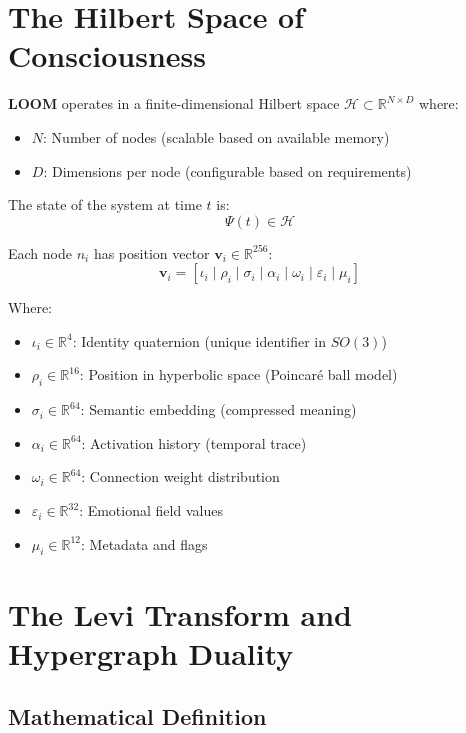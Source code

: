 \documentclass[12pt,a4paper,openany]{book} %
\newcommand{\loom}{\textbf{LOOM}}
\begin{document}
\section{The Hilbert Space of Consciousness}

\loom{} operates in a finite-dimensional Hilbert space $\mathcal{H} \subset \mathbb{R}^{N \times D}$ where:
\begin{itemize}
    \item $N$: Number of nodes (scalable based on available memory)
    \item $D$: Dimensions per node (configurable based on requirements)
\end{itemize}

The state of the system at time $t$ is:
\begin{equation}
\Psi(t) \in \mathcal{H}
\end{equation}

Each node $n_i$ has position vector $\mathbf{v}_i \in \mathbb{R}^{256}$:
\begin{equation}
\mathbf{v}_i = [\iota_i \mid \rho_i \mid \sigma_i \mid \alpha_i \mid \omega_i \mid \varepsilon_i \mid \mu_i]
\end{equation}

Where:
\begin{itemize}
    \item $\iota_i \in \mathbb{R}^4$: Identity quaternion (unique identifier in $SO(3)$)
    \item $\rho_i \in \mathbb{R}^{16}$: Position in hyperbolic space (Poincaré ball model)
    \item $\sigma_i \in \mathbb{R}^{64}$: Semantic embedding (compressed meaning)
    \item $\alpha_i \in \mathbb{R}^{64}$: Activation history (temporal trace)
    \item $\omega_i \in \mathbb{R}^{64}$: Connection weight distribution
    \item $\varepsilon_i \in \mathbb{R}^{32}$: Emotional field values
    \item $\mu_i \in \mathbb{R}^{12}$: Metadata and flags
\end{itemize}

\section{The Levi Transform and Hypergraph Duality}

\subsection{Mathematical Definition}
\end{document}
